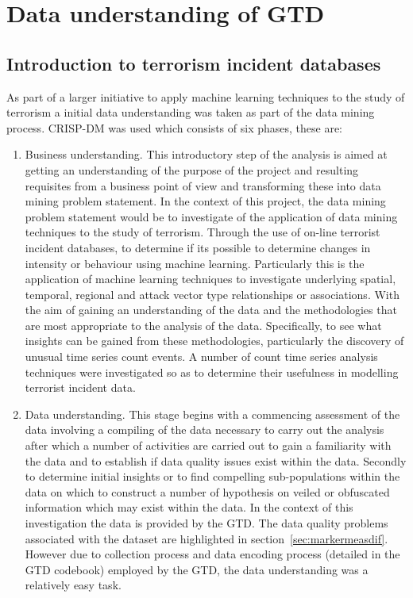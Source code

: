 \chapter[A Preliminary understanding of the global terrorism database]{Data understanding of GTD}

\section{Introduction to terrorism incident databases}
As part of a larger initiative to apply machine learning techniques to the study of terrorism a initial data understanding was taken as part of the data mining process.  CRISP-DM \citep{chapman2000crisp} was used which consists of six phases, these are:

\begin{enumerate}
\item Business understanding. This introductory step of the analysis is aimed at getting an understanding of the purpose of the project and resulting requisites from a business point of view and transforming these into data mining problem statement. 
In the context of this project, the data mining problem statement would be to investigate of the application of data mining techniques to the study of terrorism. Through the use of on-line terrorist incident  databases, to determine if its possible to determine changes in intensity or behaviour using machine learning. Particularly this is the application of machine learning techniques to investigate underlying spatial, temporal, regional and attack vector type relationships or associations. With the aim of gaining an understanding of the data and the methodologies that are most appropriate to the analysis of the data. Specifically, to see what insights can be gained from these methodologies, particularly the discovery of unusual time series count events. A number of count time series analysis techniques were investigated so as to determine their usefulness in modelling terrorist incident data. 
\item Data understanding. This stage begins with a commencing assessment of the data involving a compiling of the data necessary to carry out the analysis after which a number of activities are carried out to gain a familiarity with the data and to establish if data quality issues exist within the data. Secondly to determine initial insights or to find compelling sub-populations within the data on which to construct a number of hypothesis on veiled or obfuscated information which may exist within the data. In the context of this investigation the data is provided by the GTD. The data quality problems associated with the dataset are highlighted in section~\ref{sec:markermeasdif}. However due to collection process and data encoding process (detailed in the GTD codebook) employed by the GTD, the data understanding was a relatively easy task.

\end{enumerate}
